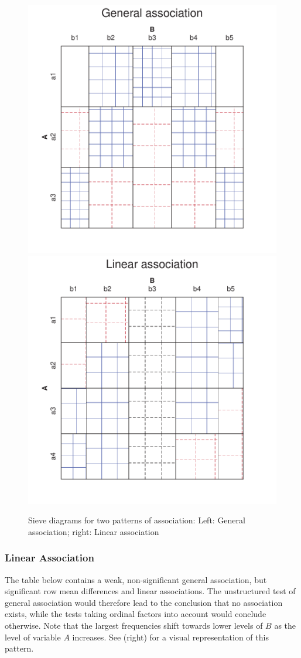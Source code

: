 \documentclass[10pt,krantz2]{krantz}\usepackage[]{graphicx}\usepackage[]{color}
\newenvironment{knitrout}{}{} %
\renewenvironment{knitrout}{\small\renewcommand{\baselinestretch}{.85}}{} %
\begin{document}
\begin{knitrout}
\color{fgcolor}\begin{figure}[!htbp]

\centerline{\includegraphics[width=.49\textwidth]{ch04/fig/cmhdemo-1} 
\includegraphics[width=.49\textwidth]{ch04/fig/cmhdemo-2} }

\caption[Sieve diagrams for two patterns of association]{Sieve diagrams for two patterns of association: Left: General association; right: Linear association}\label{fig:cmhdemo}
\end{figure}


\end{knitrout}


\subsubsection{Linear Association}

The table below contains a weak,
non-significant general association, but significant row mean
differences and linear associations.
The unstructured test of general association would therefore
lead to the conclusion that no association exists, while the
tests taking ordinal factors into account would conclude otherwise.
Note that the largest frequencies
shift towards lower levels of $B$ as the level of variable $A$ increases.
See  (right) for a visual representation of this pattern.
\end{document}
